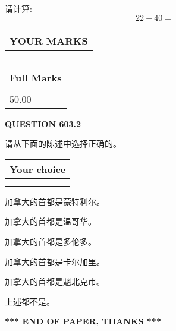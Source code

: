 \documentclass{ctexart}
\begin{document}
  
 
请计算:
\begin{equation}
22 +  %
40 = \nonumber
\end{equation}
 

 

 
  
\vspace{0.2in}
  
\noindent\begin{tabular}{|l|}
\hline
 YOUR MARKS  \\
\hline
 \\ 
 \\ 
\hline
\end{tabular}
\hspace{0.05in} \begin{tabular}{|l|}
\hline
 Full Marks  \\
\hline
 \\ 
50.00 \\
\hline
\end{tabular}
{\textbf{\Large{QUESTION
603.2 
}}}
  
  
请从下面的陈述中选择正确的。
  
  
\noindent\hspace{3.0in} \begin{tabular}{|l|}
\hline
Your choice \\
\hline
 \\ 
 \\ 
\hline
\end{tabular}
  
  
 
 
加拿大的首都是蒙特利尔。
 
 
加拿大的首都是温哥华。
 
 
加拿大的首都是多伦多。
 
 
加拿大的首都是卡尔加里。
 
 
加拿大的首都是魁北克市。
 
 
 上述都不是。
 
 
   
   
 \vspace{0.2in}
 
   
   
   
   
\vspace{1.0in} 
{\textbf{\large{ *** END OF PAPER, THANKS *** }}} 
   
\end{document}
